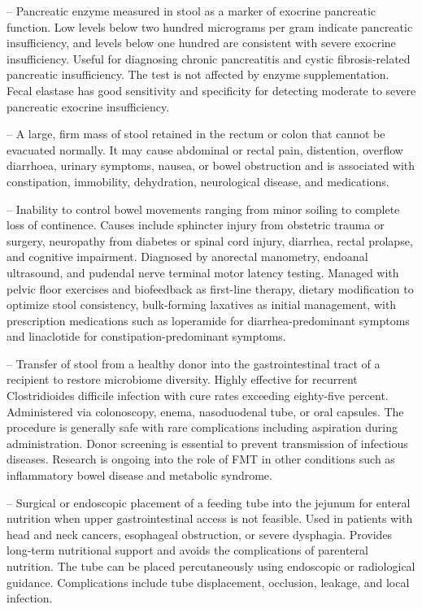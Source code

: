 -- Pancreatic enzyme measured in stool as a marker of exocrine pancreatic function. Low levels below two hundred micrograms per gram indicate pancreatic insufficiency, and levels below one hundred are consistent with severe exocrine insufficiency. Useful for diagnosing chronic pancreatitis and cystic fibrosis-related pancreatic insufficiency. The test is not affected by enzyme supplementation. Fecal elastase has good sensitivity and specificity for detecting moderate to severe pancreatic exocrine insufficiency.

-- A large, firm mass of stool retained in the rectum or colon that cannot be evacuated normally. It may cause abdominal or rectal pain, distention, overflow diarrhoea, urinary symptoms, nausea, or bowel obstruction and is associated with constipation, immobility, dehydration, neurological disease, and medications.

-- Inability to control bowel movements ranging from minor soiling to complete loss of continence. Causes include sphincter injury from obstetric trauma or surgery, neuropathy from diabetes or spinal cord injury, diarrhea, rectal prolapse, and cognitive impairment. Diagnosed by anorectal manometry, endoanal ultrasound, and pudendal nerve terminal motor latency testing. Managed with pelvic floor exercises and biofeedback as first-line therapy, dietary modification to optimize stool consistency, bulk-forming laxatives as initial management, with prescription medications such as loperamide for diarrhea-predominant symptoms and linaclotide for constipation-predominant symptoms.

-- Transfer of stool from a healthy donor into the gastrointestinal tract of a recipient to restore microbiome diversity. Highly effective for recurrent Clostridioides difficile infection with cure rates exceeding eighty-five percent. Administered via colonoscopy, enema, nasoduodenal tube, or oral capsules. The procedure is generally safe with rare complications including aspiration during administration. Donor screening is essential to prevent transmission of infectious diseases. Research is ongoing into the role of FMT in other conditions such as inflammatory bowel disease and metabolic syndrome.

-- Surgical or endoscopic placement of a feeding tube into the jejunum for enteral nutrition when upper gastrointestinal access is not feasible. Used in patients with head and neck cancers, esophageal obstruction, or severe dysphagia. Provides long-term nutritional support and avoids the complications of parenteral nutrition. The tube can be placed percutaneously using endoscopic or radiological guidance. Complications include tube displacement, occlusion, leakage, and local infection.

